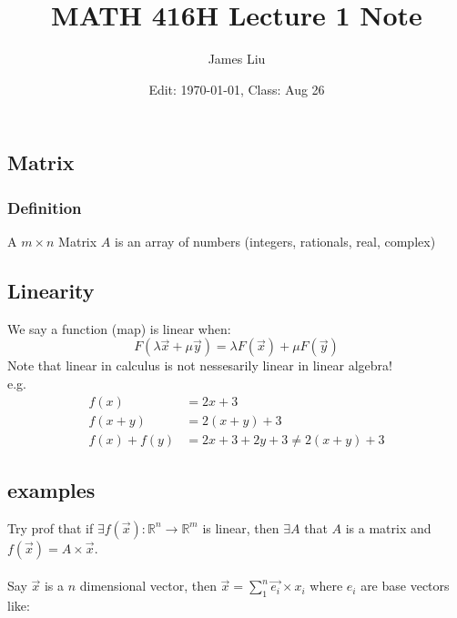 \documentclass{article}
\date{Edit: \today, Class: Aug 26}
\title{MATH 416H Lecture 1 Note}
\author{James Liu}
\begin{document}
\maketitle

\subsection*{Matrix}
\subsubsection*{Definition}
A \(m\times n\) Matrix \(A\) is an array of numbers (integers, rationals, real, complex)
\subsection*{Linearity}
We say a function (map) is linear when: 
\[F(\lambda \overrightarrow{x} + \mu \overrightarrow{y} ) = \lambda F(\overrightarrow{x})+\mu F(\overrightarrow{y})\]
Note that linear in calculus is not nessesarily linear in linear algebra!
\\e.g. 
\begin{align*}
    f(x)&=2x+3\\
    f(x+y)&=2(x+y)+3\\
    f(x)+f(y)&=2x+3+2y+3 \neq 2(x+y)+3
\end{align*}
\subsection*{examples}
Try prof that if \(\exists f(\overrightarrow{x}):\mathbb{R}^n \rightarrow \mathbb{R}^m\) is linear, then \(\exists A\) that \(A\) is a matrix and \(f(\overrightarrow{x})=A\times\overrightarrow{x}\).
\\ \\
Say \(\overrightarrow{x}\) is a \(n\) dimensional vector, then \(\overrightarrow{x}=\sum_{1}^{n} \overrightarrow{e_i}\times x_i\) where \(e_i\) are base vectors like:
\end{document}
